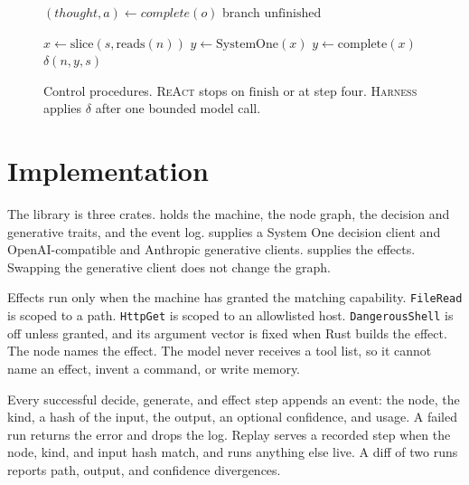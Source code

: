 \documentclass[11pt]{article}
\begin{document}
\begin{figure}[t]
\centering
\begin{minipage}[t]{0.48\textwidth}
\centering
\begin{algorithmic}[1]
  \State $(thought, a) \gets complete(o)$
    \State \Return branch
  \EndIf
\EndFor
\State \Return $\mathrm{unfinished}$
\EndProcedure
\end{algorithmic}
\end{minipage}\hfill
\begin{minipage}[t]{0.48\textwidth}
\centering
\begin{algorithmic}[1]
\State $x \gets \mathrm{slice}(s, \mathrm{reads}(n))$
  \State $y \gets \mathrm{SystemOne}(x)$
  \State $y \gets \mathrm{complete}(x)$
\EndIf
\State \Return $\delta(n, y, s)$
\EndProcedure
\end{algorithmic}
\end{minipage}
\caption{Control procedures. \textsc{ReAct} stops on $\mathrm{finish}$ or at
step four. \textsc{Harness} applies $\delta$ after one bounded model call.}
\label{fig:procedures}
\end{figure}

\section{Implementation}
\label{sec:implementation}

The library is three crates.  holds the machine, the
node graph, the decision and generative traits, and the event log.
 supplies a System One decision client and
OpenAI-compatible and Anthropic generative clients. 
supplies the effects. Swapping the generative client does not change the
graph.

Effects run only when the machine has granted the matching capability.
\texttt{FileRead} is scoped to a path. \texttt{HttpGet} is scoped to an
allowlisted host. \texttt{DangerousShell} is off unless granted, and its
argument vector is fixed when Rust builds the effect. The node names the
effect. The model never receives a tool list, so it cannot name an effect,
invent a command, or write memory.

Every successful decide, generate, and effect step appends an event: the
node, the kind, a hash of the input, the output, an optional confidence, and
usage. A failed run returns the error and drops the log. Replay serves a
recorded step when the node, kind, and input hash match, and runs anything
else live. A diff of two runs reports path, output, and confidence
divergences.
\end{document}
